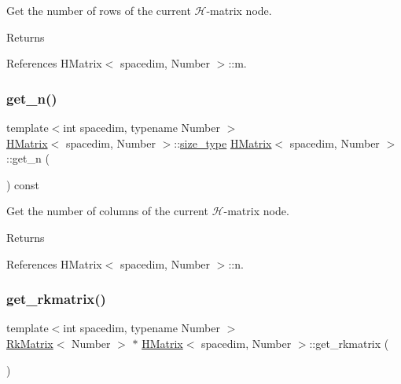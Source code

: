 Get the number of rows of the current $\mathcal{H}$-\/matrix node. \begin{DoxyReturn}{Returns}

\end{DoxyReturn}


References H\+Matrix$<$ spacedim, Number $>$\+::m.

\mbox{\label{classHMatrix_abff89130116d62ea4159bc69ca11f8d5}} 
\subsubsection{\texorpdfstring{get\+\_\+n()}{get\_n()}}
{\footnotesize\ttfamily template$<$int spacedim, typename Number $>$ \\
\hyperlink{classHMatrix}{H\+Matrix}$<$ spacedim, Number $>$\+::\hyperlink{classHMatrix_a5ca8dc549783d38371a01ecd621ecb34}{size\+\_\+type} \hyperlink{classHMatrix}{H\+Matrix}$<$ spacedim, Number $>$\+::get\+\_\+n (\begin{DoxyParamCaption}{ }\end{DoxyParamCaption}) const}

Get the number of columns of the current $\mathcal{H}$-\/matrix node. \begin{DoxyReturn}{Returns}

\end{DoxyReturn}


References H\+Matrix$<$ spacedim, Number $>$\+::n.

\mbox{\label{classHMatrix_a0189de6e276fbd3425c4a7ef132f5e16}} 
\subsubsection{\texorpdfstring{get\+\_\+rkmatrix()}{get\_rkmatrix()}\hspace{0.1cm}{\footnotesize\ttfamily [1/2]}}
{\footnotesize\ttfamily template$<$int spacedim, typename Number $>$ \\
\hyperlink{classRkMatrix}{Rk\+Matrix}$<$ Number $>$ $\ast$ \hyperlink{classHMatrix}{H\+Matrix}$<$ spacedim, Number $>$\+::get\+\_\+rkmatrix (\begin{DoxyParamCaption}{ }\end{DoxyParamCaption})}

